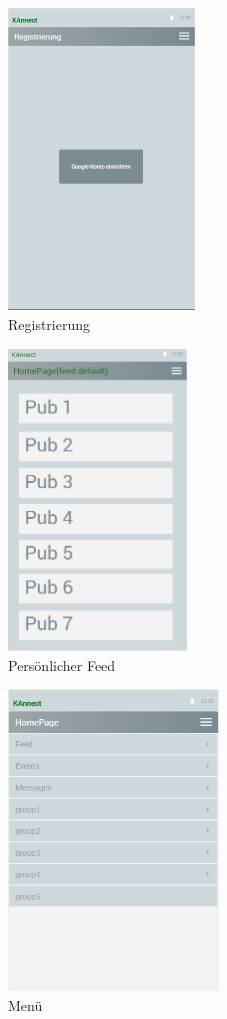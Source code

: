 \documentclass[parskip=full]{scrartcl}
\begin{document}
\newpage	
	
		\begin{figure}[h]
			\centering
			\includegraphics[height=8cm]{Registrierung}
			\caption{Registrierung}
			\label{Registrierung}
		\end{figure}

		\begin{figure}[h]
			\centering
			\includegraphics[height=8cm]{PFeed}
			\caption{Persönlicher Feed}
			\label{PersönlicherFeed}
			\hypertarget{PFeed}{}
		\end{figure}
		
		\begin{figure}[h]
			\centering
			\includegraphics[height=8cm]{Menu}
			\caption{Menü}
			\label{Menü}
		\end{figure}
			
\end{document}
